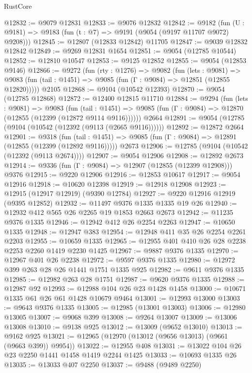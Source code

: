 \begin{lexlean}{RustCore}
\begin{coremodule}
@12832 := @9079 @12831
@12833 := @9076 @12832
@12842 := @9182
    (fun (U : @9181) => @9183 (fun (t : @7) => @9191 (@9054 (@9197 @11707 @9072) @9208)))
@12845 := @12807 (@12833 @12842) @11705
@12847 := @9039 @12832 @12842
@12849 := @9269 @12831 @1654
@12851 := @9054 (@12785 @10544)
@12852 := @12810 @10547
@12853 := @9125 @12852
@12855 := @9054 (@12853 @9146)
@12866 := @9272
    (fun (rty : @1276) =>
    @9082
      (fun (lets : @9081) =>
      @9083 (fun (tail : @1451) => @9085 (fun (Γ : @9084) => @12851 (@12855 @12820)))))
    @2105
@12868 := @9104 (@10542 @12393)
@12870 := @9054 (@12785 @12868)
@12872 := @12400 @12815 @11710
@12884 := @9294
    (fun (lets : @9081) =>
    @9083
      (fun (tail : @1451) =>
      @9085 (fun (Γ : @9084) => @12870 (@12855 (@12399 (@12872 @9114 @9116))))))
    @2664
@12891 := @9054 (@12785 (@9104 (@10542 (@12392 (@9113 (@2665 @9116))))))
@12892 := @12872 @2664
@12901 := @9318
    (fun (tail : @1451) => @9085 (fun (Γ : @9084) => @12891 (@12855 (@12399 (@12892 @9116)))))
    @2673
@12906 := @12785 (@9104 (@10542 (@12392 (@9113 @2674))))
@12907 := @9054 @12906
@12908 := @12892 @2673
@12914 := @9336 (fun (Γ : @9084) => @12907 (@12855 (@12399 @12908))) @9376
@12915 := @9220 @12906
@12916 := @12853 @10617
@12917 := @9054 @12916
@12918 := @10620 @12398
@12919 := @12918 @12908
@12923 := @12915 (@12917 @12919) (@9390 @12784)
@12927 := @9220 @12916 @12919 (@9395 @12852)
@12932 := @11497 @9376 @1335 @1335 @19 @26
@12940 := @12932 @412 @565 @26 @2265 @19 @1853 @2663 @2673
@12942 := @11235 @9376 @1335
@12946 := @12942 @412 @26 @2254 @2263
@12947 := @10650 @1335
@12948 := @12947 @383
@12954 := @12948 @411 @35 @26 @2254 @2261 @2203
@12955 := @10659 @1335
@12965 := @12955 @401 @410 @26 @28 @2238 @2253 @2260 @1419 @2230 @1425
@12967 := @9887 @9376 @1335
@12970 := @12967 @401 @26 @2238
@12972 := @9597 @9376 @1335
@12980 := @12972 @399 @263 @28 @26 @1441 @1751 @1335 @925
@12982 := @9611 @9376 @1335
@12985 := @12982 @263 @28 @1751
@12987 := @9620 @9376 @1335
@12988 := @12987 @92
@12993 := @12988 @104 @26 @23 @1428 @1458
@13000 := @10671 @1335 @61 @26 @61 @1428 @10679 @9464
@13001 := @12993 @13000
@13003 := @9643 @9376 @1335
@13005 := @12985 (@13001 @13003)
@13006 := @12980 @13005
@13007 := @9068 @399
@13008 := @9264 @13007
@13009 := @13006 @13008
@13010 := @9138 @925
@13012 := @13009 (@9652 @13010)
@13013 := @9162 @925
@13021 := @12965 (@12970 (@13012 (@9656 @13013) (@9661 (@9663 @399)) @9954))
@13022 := @12955 @408
@13031 := @13022 @104 @26 @23 @2250 @1441 @1458 @1419 @2244 @1425
@13033 := @10693 @1335 @26
@13035 := @13033 @407 @2250
@13037 := @9488 (@9489 @2250)

\end{coremodule}
\end{lexlean}
